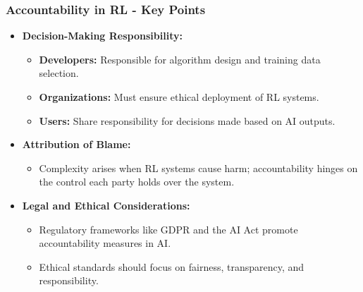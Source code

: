 \documentclass[aspectratio=169]{beamer}
\begin{document}
\begin{frame}[fragile]
  \frametitle{Accountability in RL - Key Points}
  
  \begin{itemize}
    \item \textbf{Decision-Making Responsibility:}
      \begin{itemize}
        \item \textbf{Developers:} Responsible for algorithm design and training data selection.
        \item \textbf{Organizations:} Must ensure ethical deployment of RL systems.
        \item \textbf{Users:} Share responsibility for decisions made based on AI outputs.
      \end{itemize}
    
    \item \textbf{Attribution of Blame:}
      \begin{itemize}
        \item Complexity arises when RL systems cause harm; accountability hinges on the control each party holds over the system.
      \end{itemize}
    
    \item \textbf{Legal and Ethical Considerations:}
      \begin{itemize}
        \item Regulatory frameworks like GDPR and the AI Act promote accountability measures in AI.
        \item Ethical standards should focus on fairness, transparency, and responsibility.
      \end{itemize}
  \end{itemize}
  
\end{frame}
\end{document}
